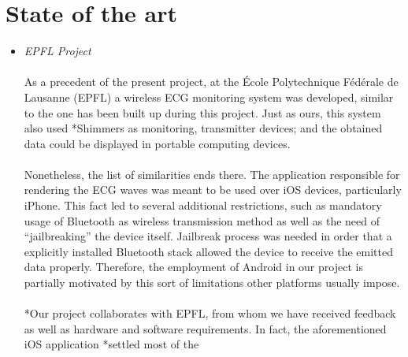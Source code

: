 	\section{State of the art}
		\begin{itemize}
			\item \emph{EPFL Project}\\\\
				As a precedent of the present project, at the École Polytechnique Fédérale de Lausanne (EPFL)
				a wireless ECG monitoring system was developed, similar to the one has been built up during
				this project. Just as ours, this system also used *Shimmers as monitoring, transmitter devices; %
				and the obtained data could be displayed in portable computing devices.\\\\
				Nonetheless, the list of similarities ends there. The application responsible for rendering
				the ECG waves was meant to be used over iOS devices, particularly iPhone. This fact led to several
				additional restrictions, such as mandatory usage of Bluetooth as wireless transmission method as
				well as the need of ``jailbreaking'' the device itself. Jailbreak process was needed in order that
				a explicitly installed Bluetooth stack allowed the device to receive the emitted data properly.
				Therefore, the employment of Android in our project is partially motivated by this sort of
				limitations other platforms usually impose.\\\\
				*Our project collaborates with EPFL, from whom we have received feedback as well as hardware and %
				software requirements. In fact, the aforementioned iOS application *settled most of the

\end{itemize}
